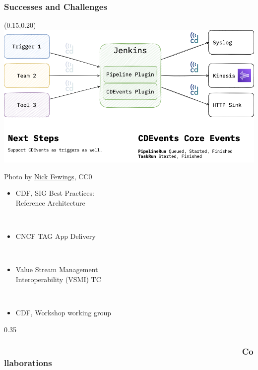 \documentclass[aspectratio=169,11pt,hyperref={colorlinks=true}]{beamer}
\begin{document}
\begin{grayframe}
  \frametitle{Successes and Challenges}
  \begin{textblock*}{0.70\paperwidth}(0.15\paperwidth,0.20\paperheight)
    \includegraphics[width=0.70\paperwidth]{img/cdevents-Jenkins.png}
  \end{textblock*}
\end{grayframe}

\begin{lpicrblack}{%
  Photo by \href{https://unsplash.com/@jannerboy62}{\underline{Nick Fewings}}, CC0
  }%
  {%
  \begin{itemize}
    \item CDF, SIG Best Practices:\\
    Reference Architecture
  \end{itemize}
  ~ \\
  \begin{itemize}
    \item CNCF TAG App Delivery
  \end{itemize}
  ~ \\
  \begin{itemize}
    \item Value Stream Management\\
          Interoperability (VSMI) TC
  \end{itemize}
  ~ \\
  \begin{itemize}
    \item CDF, Workshop working group
  \end{itemize}
  }%
  {0.35}
  \frametitle{~~~~~~~~~~~~~~~~~~~~~~~~~~~~~~~~~~~~~~~~~~~~~~~~~~~Collaborations}
\end{lpicrblack}
\end{document}
